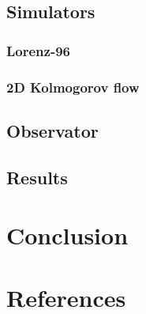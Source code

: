\documentclass[a4paper, 12pt]{article}
\begin{document}
\subsection{Simulators}
\subsubsection{Lorenz-96}
\subsubsection{2D Kolmogorov flow}
\subsection{Observator}
\subsection{Results}

\section{Conclusion}

\section{References}
\end{document}
